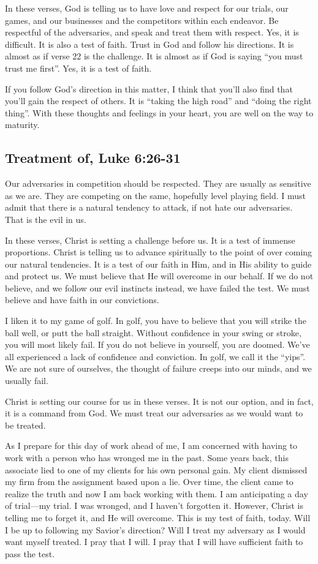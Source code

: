 \documentclass[12pt]{memoir}
\begin{document}
In these verses, God is telling us to have love and respect for our
trials, our games, and our businesses and the competitors within each
endeavor. Be respectful of the adversaries, and speak and treat them
with respect. Yes, it is difficult. It is also a test of faith. Trust
in God and follow his directions. It is almost as if verse 22 is the
challenge. It is almost as if God is saying ``you must trust me first''.
Yes, it is a test of faith. 

If you follow God's direction in this matter, I think that you'll
also find that you'll gain the respect of others. It is ``taking
the high road'' and ``doing the right thing''. With these thoughts
and feelings in your heart, you are well on the way to maturity. 

\subsection{Treatment of, Luke 6:26-31}

Our adversaries in competition should be respected. They are usually
as sensitive as we are. They are competing on the same, hopefully
level playing field. I must admit that there is a natural tendency
to attack, if not hate our adversaries. That is the evil in us.

In these verses, Christ is setting a challenge before us. It is a
test of immense proportions. Christ is telling us to advance spiritually
to the point of over coming our natural tendencies. It is a test of
our faith in Him, and in His ability to guide and protect us. We must
believe that He will overcome in our behalf. If we do not believe,
and we follow our evil instincts instead, we have failed the test.
We must believe and have faith in our convictions.

I liken it to my game of golf. In golf, you have to believe that you
will strike the ball well, or putt the ball straight. Without confidence
in your swing or stroke, you will most likely fail. If you do not
believe in yourself, you are doomed. We've all experienced a lack
of confidence and conviction. In golf, we call it the ``yips''.
We are not sure of ourselves, the thought of failure creeps into our
minds, and we usually fail.

Christ is setting our course for us in these verses. It is not our
option, and in fact, it is a command from God. We must treat our adversaries
as we would want to be treated.

As I prepare for this day of work ahead of me, I am concerned with
having to work with a person who has wronged me in the past. Some
years back, this associate lied to one of my clients for his own personal
gain. My client dismissed my firm from the assignment based upon a
lie. Over time, the client came to realize the truth and now I am
back working with them. I am anticipating a day of trial---my trial.
I was wronged, and I haven't forgotten it. However, Christ is telling
me to forget it, and He will overcome. This is my test of faith, today.
Will I be up to following my Savior's direction? Will I treat my adversary
as I would want myself treated. I pray that I will. I pray that I
will have sufficient faith to pass the test.
\end{document}
